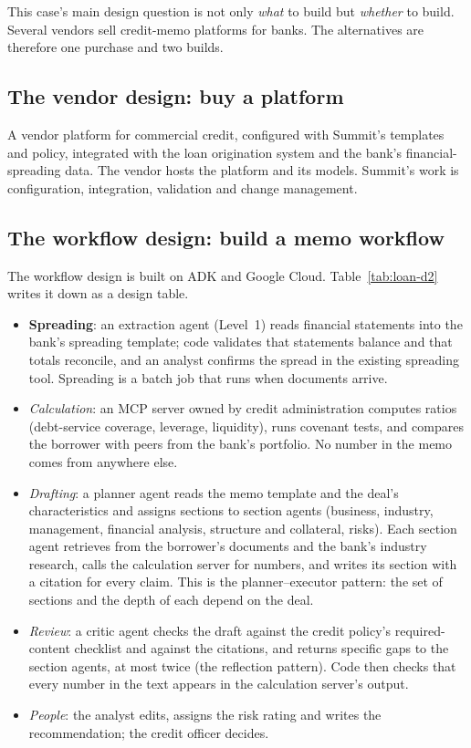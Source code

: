 This case's main design question is not only \emph{what} to build but \emph{whether} to build. Several vendors sell credit-memo platforms for banks. The alternatives are therefore one purchase and two builds.

\subsection{The vendor design: buy a platform}

A vendor platform for commercial credit, configured with Summit's templates and policy, integrated with the loan origination system and the bank's financial-spreading data. The vendor hosts the platform and its models. Summit's work is configuration, integration, validation and change management.

\subsection{The workflow design: build a memo workflow}

The workflow design is built on ADK and Google Cloud. Table~\ref{tab:loan-d2} writes it down as a design table.
\begin{itemize}[itemsep=1pt]
  \item \textbf{Spreading}: an extraction agent (Level~1) reads financial statements into the bank's spreading template; code validates that statements balance and that totals reconcile, and an analyst confirms the spread in the existing spreading tool. Spreading is a batch job that runs when documents arrive.
  \item \emph{Calculation}: an MCP server owned by credit administration computes ratios (debt-service coverage, leverage, liquidity), runs covenant tests, and compares the borrower with peers from the bank's portfolio. No number in the memo comes from anywhere else.
  \item \emph{Drafting}: a planner agent reads the memo template and the deal's characteristics and assigns sections to section agents (business, industry, management, financial analysis, structure and collateral, risks). Each section agent retrieves from the borrower's documents and the bank's industry research, calls the calculation server for numbers, and writes its section with a citation for every claim. This is the planner--executor pattern: the set of sections and the depth of each depend on the deal.
  \item \emph{Review}: a critic agent checks the draft against the credit policy's required-content checklist and against the citations, and returns specific gaps to the section agents, at most twice (the reflection pattern). Code then checks that every number in the text appears in the calculation server's output.
  \item \emph{People}: the analyst edits, assigns the risk rating and writes the recommendation; the credit officer decides.
\end{itemize}

